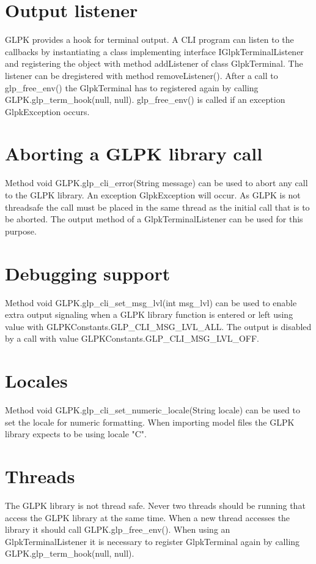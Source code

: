 \documentclass[a4paper,11pt]{report}
\begin{document}
\section{Output listener}
GLPK provides a hook for terminal output. A CLI program can listen to the
callbacks by instantiating a class implementing interface IGlpkTerminalListener
and registering the object with method addListener of class GlpkTerminal.
The listener can be dregistered with method removeListener().
After a call to glp\_free\_env() the GlpkTerminal has to registered again
by calling GLPK.glp\_term\_hook(null, null). glp\_free\_env() is called if
an exception GlpkException occurs.

\section{Aborting a GLPK library call}
Method void GLPK.glp\_cli\_error(String message) can be used to abort any call
to the GLPK library. An exception GlpkException will occur. As GLPK is not
threadsafe the call must be placed in the same thread as the initial call that
is to be aborted. The output method of a GlpkTerminalListener can be used
for this purpose.

\section{Debugging support}
Method void GLPK.glp\_cli\_set\_msg\_lvl(int msg\_lvl) can be used to enable
extra output signaling when a GLPK library function is entered or left using 
value with GLPKConstants.GLP\_CLI\_MSG\_LVL\_ALL. The output is disabled by a
call with value GLPKConstants.GLP\_CLI\_MSG\_LVL\_OFF.

\section{Locales}
Method void GLPK.glp\_cli\_set\_numeric\_locale(String locale) can be used to
set the locale for numeric formatting. When importing model files the GLPK
library expects to be using locale "C".

\section{Threads}
The GLPK library is not thread safe. Never two threads should be running that
access the GLPK library at the same time. When a new thread accesses the
library it should call GLPK.glp\_free\_env(). When using an GlpkTerminalListener
it is necessary to register GlpkTerminal again by calling
\linebreak GLPK.glp\_term\_hook(null, null).
\end{document}
